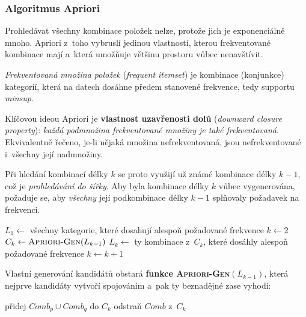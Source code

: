 \documentclass[11pt,a4paper]{article}
\theoremstyle{definition}
\begin{document}
\subsubsection{Algoritmus Apriori}

Prohledávat všechny kombinace položek nelze, protože jich je exponenciálně mnoho. Apriori
z~toho vybruslí jedinou vlastností, kterou frekventované kombinace mají a~která umožňuje
většinu prostoru vůbec nenavštívit.

\begin{defbox}
\emph{Frekventovaná množina položek} (\emph{frequent itemset}) je kombinace (konjunkce)
kategorií, která na datech dosáhne předem stanovené frekvence, tedy supportu \emph{minsup}.

Klíčovou ideou Apriori je \textbf{vlastnost uzavřenosti dolů} (\emph{downward closure
property}): \emph{každá podmnožina frekventované množiny je také frekventovaná}. Ekvivalentně
řečeno, je-li nějaká množina nefrekventovaná, jsou nefrekventované i~všechny její nadmnožiny.

Při hledání kombinací délky $k$ se proto využijí už známé kombinace délky $k-1$, což je
\emph{prohledávání do šířky}. Aby byla kombinace délky $k$ vůbec vygenerována, požaduje se,
aby \emph{všechny} její podkombinace délky $k-1$ splňovaly požadavek na frekvenci.
\end{defbox}

\begin{defbox}
\begin{algorithmic}[1]
\State $L_1\gets$ všechny kategorie, které dosahují alespoň požadované frekvence
\State $k\gets 2$
  \State $C_k\gets \textsc{Apriori-Gen}(L_{k-1})$ 
  \State $L_k\gets$ ty kombinace z~$C_k$, které dosáhly alespoň požadované frekvence
  \State $k\gets k+1$
\EndWhile
\end{algorithmic}

Vlastní generování kandidátů obstará \textbf{funkce \textsc{Apriori-Gen}$(L_{k-1})$}, která
nejprve kandidáty vytvoří spojováním a~pak ty beznadějné zase vyhodí:
\begin{algorithmic}[1]
     \State přidej $\mathit{Comb}_p\cup \mathit{Comb}_q$ do $C_k$ 
  \EndIf
\EndFor
{} 
     \State odstraň $\mathit{Comb}$ z~$C_k$
  \EndIf
\EndFor
\end{algorithmic}
\end{defbox}
\end{document}
